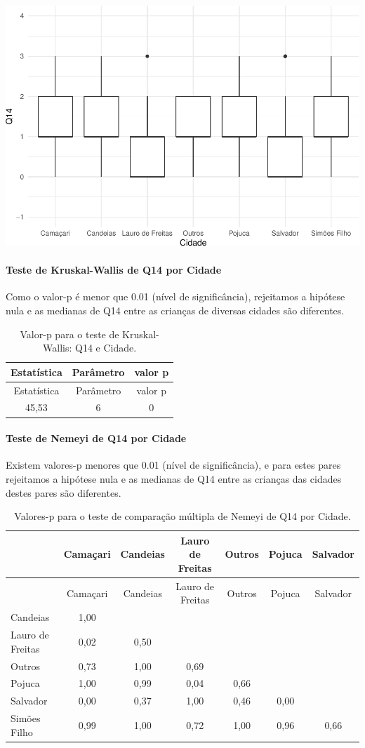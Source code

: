 \documentclass[]{article}
\let\oldparagraph\paragraph
\renewcommand{\paragraph}[1]{\oldparagraph{#1}\mbox{}}
\begin{document}
\begin{center}\includegraphics[width=0.75\linewidth]{relatorio_covid19_files/figure-latex/unnamed-chunk-17-1} \end{center}

\hypertarget{teste-de-kruskal-wallis-de-q14-por-cidade}{%
\paragraph{Teste de Kruskal-Wallis de Q14 por Cidade}\label{teste-de-kruskal-wallis-de-q14-por-cidade}}

Como o valor-p é menor que 0.01 (nível de significância), rejeitamos a hipótese nula e as medianas de Q14 entre as crianças de diversas cidades são diferentes.

\begin{longtable}[]{@{}ccc@{}}
\caption{\label{tab:unnamed-chunk-19}Valor-p para o teste de Kruskal-Wallis: Q14 e Cidade.}\tabularnewline
\toprule
Estatística & Parâmetro & valor p\tabularnewline
\midrule
\endfirsthead
\toprule
Estatística & Parâmetro & valor p\tabularnewline
\midrule
\endhead
45,53 & 6 & 0\tabularnewline
\bottomrule
\end{longtable}

\hypertarget{teste-de-nemeyi-de-q14-por-cidade}{%
\paragraph{Teste de Nemeyi de Q14 por Cidade}\label{teste-de-nemeyi-de-q14-por-cidade}}

Existem valores-p menores que 0.01 (nível de significância), e para estes pares rejeitamos a hipótese nula e as medianas de Q14 entre as crianças das cidades destes pares são diferentes.

\begin{longtable}[]{@{}lcccccc@{}}
\caption{\label{tab:unnamed-chunk-21}Valores-p para o teste de comparação múltipla de Nemeyi de Q14 por Cidade.}\tabularnewline
\toprule
& Camaçari & Candeias & Lauro de Freitas & Outros & Pojuca & Salvador\tabularnewline
\midrule
\endfirsthead
\toprule
& Camaçari & Candeias & Lauro de Freitas & Outros & Pojuca & Salvador\tabularnewline
\midrule
\endhead
Candeias & 1,00 & & & & &\tabularnewline
Lauro de Freitas & 0,02 & 0,50 & & & &\tabularnewline
Outros & 0,73 & 1,00 & 0,69 & & &\tabularnewline
Pojuca & 1,00 & 0,99 & 0,04 & 0,66 & &\tabularnewline
Salvador & 0,00 & 0,37 & 1,00 & 0,46 & 0,00 &\tabularnewline
Simões Filho & 0,99 & 1,00 & 0,72 & 1,00 & 0,96 & 0,66\tabularnewline
\bottomrule
\end{longtable}
\end{document}
